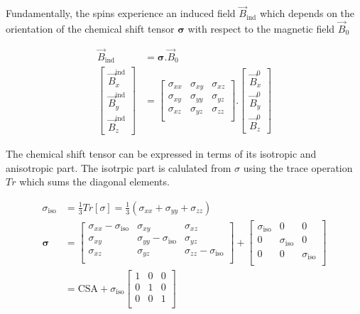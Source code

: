 \documentclass[11pt]{article}
\theoremstyle{definition}
\begin{document}
Fundamentally, the spins experience an induced field $\vec B_\text{ind}$ which depends on the orientation of the chemical shift tensor $\mathbf{\sigma}$ with respect to the magnetic field $\vec B_0$

\begin{align}
	\vec B_\text{ind} &= \mathbf{\sigma}.\vec B_0\\
	\begin{bmatrix}
		\vec B^\text{ind}_x\\
		\vec B^\text{ind}_y\\
		\vec B^\text{ind}_z
	\end{bmatrix}&=
	\begin{bmatrix}
		\sigma_{xx} & \sigma_{xy} & \sigma_{xz}\\
		\sigma_{xy} & \sigma_{yy} & \sigma_{yz}\\
		\sigma_{xz} & \sigma_{yz} & \sigma_{zz}\\
	\end{bmatrix}.
	\begin{bmatrix}
		\vec B^0_x\\
		\vec B^0_y\\
		\vec B^0_z
	\end{bmatrix}
\end{align}

The chemical shift tensor can be expressed in terms of its isotropic and anisotropic part. The isotrpic part is calulated from $\sigma$ using the trace operation $Tr$ which sums the diagonal elements.

\begin{align}
	\sigma_\text{iso}&= \frac{1}{3}Tr[\sigma] = \frac{1}{3}(\sigma_{xx} + \sigma_{yy} + \sigma_{zz})\\
	\mathbf{\sigma}&=
	\begin{bmatrix}
		\sigma_{xx}-\sigma_\text{iso} & \sigma_{xy} & \sigma_{xz}\\
		\sigma_{xy} & \sigma_{yy}-\sigma_\text{iso} & \sigma_{yz}\\
		\sigma_{xz} & \sigma_{yz} & \sigma_{zz}-\sigma_\text{iso}\\
	\end{bmatrix} +
	\begin{bmatrix}
		\sigma_\text{iso} & 0 & 0\\
		0 & \sigma_\text{iso} & 0\\
		0 & 0 & \sigma_\text{iso}\\
	\end{bmatrix}\\
	&= \text{CSA} + \sigma_\text{iso}
	\begin{bmatrix}
		1 & 0 & 0\\
		0 & 1 & 0\\
		0 & 0 & 1\\
	\end{bmatrix}
\end{align}
\end{document}

